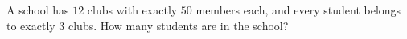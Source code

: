 A school has $12$ clubs with exactly $50$ members each, and every student belongs to exactly $3$ clubs. How many students are in the school?

